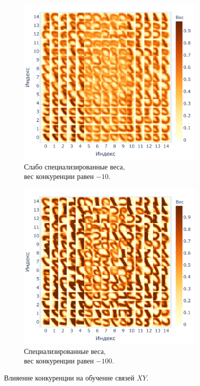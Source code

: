 \documentclass[a4paper]{article}
\begin{document}
\begin{figure}[H]
\centering
\begin{subfigure}{0.45\textwidth}
    \includegraphics[width=\textwidth,keepaspectratio=true]{weights_XY_bad_ru.pdf}
    \caption{Слабо специализированные веса,\\ вес конкуренции равен $-10$.}
\end{subfigure}
\begin{subfigure}{0.45\textwidth}
    \includegraphics[width=\textwidth,keepaspectratio=true]{weights_XY_good_ru.pdf}
    \caption{Специализированные веса,\\ вес конкуренции равен $-100$.}
\end{subfigure}
\caption{Влияение конкуренции на обучение связей $XY$.}
\label{competition-training-importance}
\end{figure}
\end{document}
